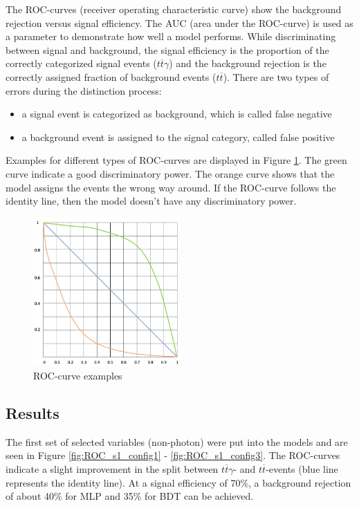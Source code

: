 \documentclass[11pt]{scrartcl}
\begin{document}
The ROC-curves (receiver operating characteristic curve) show the background rejection versus signal efficiency. The AUC (area under the ROC-curve) is used as a parameter to demonstrate how well a model performs. While discriminating between signal and background, the signal efficiency is the proportion of the correctly categorized signal events ($t\overline{t}\gamma$) and the background rejection is the correctly assigned fraction of background events ($t\overline{t}$). There are two types of errors during the distinction process:
		\begin{itemize}
  			\item a signal event is categorized as background, which is called false negative
  			\item a background event is assigned to the signal category, called false positive  			
  		\end{itemize}			
  		
Examples for different types of ROC-curves are displayed in Figure \ref{fig:ROC_ex}. The green curve indicate a good discriminatory power. The orange curve shows that the model assigns the events the wrong way around. If the ROC-curve follows the identity line, then the model doesn't have any discriminatory power.

	\begin{figure}[H]
	\centering
	\includegraphics[width=0.5\textwidth]{figures/ROC_curve.png}
	\caption{ROC-curve examples}
	 \label{fig:ROC_ex}	
	\end{figure}
	
	\subsection{Results}
	
	The first set of selected variables (non-photon) were put into the models and are seen in Figure \ref{fig:ROC_s1_config1} - \ref{fig:ROC_s1_config3}. The ROC-curves indicate a slight improvement in the split between $t\overline{t}\gamma$- and $t\overline{t}$-events (blue line represents the identity line). At a signal efficiency of 70\%, a background rejection of about 40\% for MLP and 35\% for BDT can be achieved.
	
\end{document}
